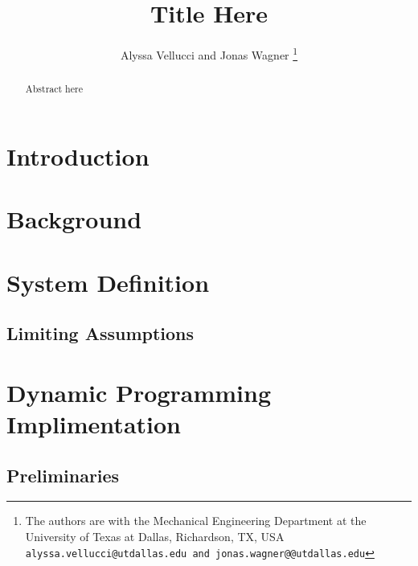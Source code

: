 \documentclass[letterpaper, 10 pt, conference]{ieeeconf}
\title{
    \LARGE \bf
    Title Here
}
\author{
    Alyssa Vellucci and Jonas Wagner
    \thanks{
        The authors are with the Mechanical Engineering Department at the University of Texas at Dallas, Richardson, TX, USA 
    {\tt\small alyssa.vellucci@utdallas.edu and jonas.wagner@@utdallas.edu}
    }
}
\begin{document}
\maketitle
\begin{abstract}
    Abstract here
\end{abstract}


\section{Introduction}












\section{Background}






\section{System Definition}
\subsection{Limiting Assumptions}




% 




\section{Dynamic Programming Implimentation}

\subsection{Preliminaries}
\end{document}
